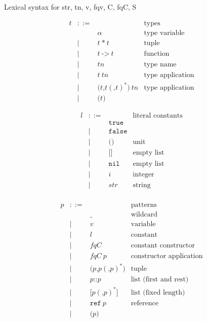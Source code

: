 \documentclass[12pt,a4paper]{book}
\newcommand{\TODO}[1]{{\color{red}#1}}
\newcommand{\gramsep}{|}
\begin{document}
\TODO{Lexical syntax for str, tn, v, fqv, C, fqC, S}

\[
\begin{array}{lcll}
t & ::= & &\mbox{types}\\
&&\alpha & \mbox{type variable}\\
& \gramsep& t\ \texttt{*}\ t & \mbox{tuple}\\
 &\gramsep &t\ \texttt{->}\ t&\mbox{function}\\
 &\gramsep& \mathit{tn}&\mbox{type name}\\
 &\gramsep&t\ \mathit{tn}&\mbox{type application}\\
 &\gramsep& \texttt{(}t\texttt{,}t(\texttt{,}t)^*\texttt{)}\ \mathit{tn}&\mbox{type application}\\
 &\gramsep&\texttt{(}t\texttt{)}
 \end{array}
 \]

 \[
\begin{array}{lcll}
l & ::= &&\mbox{literal constants}\\
&& \texttt{true}\\
&\gramsep& \texttt{false}\\
&\gramsep& \texttt{(}\texttt{)}&\mbox{unit}\\
&\gramsep& \texttt{[}\texttt{]}&\mbox{empty list}\\
&\gramsep& \texttt{nil}&\mbox{empty list}\\
&\gramsep& i &\mbox{integer}\\
&\gramsep& \textit{str} &\mbox{string}\\
 \end{array}
\]

\[
\begin{array}{lcll}
p & ::= & &\mbox{patterns}\\
&&\texttt{\_}&\mbox{wildcard}\\
&\gramsep& v &\mbox{variable}\\
&\gramsep& l &\mbox{constant}\\
&\gramsep& \mathit{fqC} & \mbox{constant constructor}\\
&\gramsep& \mathit{fqC}\ p & \mbox{constructor application}\\
&\gramsep& \texttt{(}p\texttt{,}p(\texttt{,}p)^*\texttt{)}&\mbox{tuple}\\
&\gramsep& p \texttt{::} p&\mbox{list (first and rest)}\\
&\gramsep& \texttt{[}p(\texttt{,}p)^*\texttt{]}&\mbox{list (fixed length)}\\
 &\gramsep& \texttt{ref}\ p&\mbox{reference}\\
 &\gramsep& \texttt{(}p\texttt{)}
 \end{array}
\]
\end{document}
